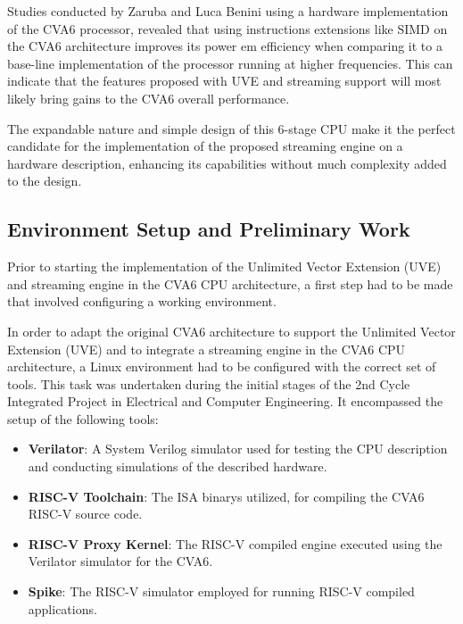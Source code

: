 Studies conducted by Zaruba and Luca Benini \cite{8777130} using a hardware implementation of the CVA6 processor, revealed that using instructions extensions like SIMD on the CVA6 architecture improves its power em efficiency when comparing it to a base-line implementation of the processor running at higher frequencies. This can indicate that the features proposed with UVE and streaming support will most likely bring gains to the CVA6 overall performance.


The expandable nature and simple design of this 6-stage CPU make it the perfect candidate for the implementation of the proposed streaming engine on a hardware description, enhancing its capabilities without much complexity added to the design.




\subsection{Environment Setup and Preliminary Work}

Prior to starting the implementation of the Unlimited Vector Extension (UVE) and streaming engine in the CVA6 CPU architecture, a first step had to be made that involved configuring a working environment.

In order to adapt the original CVA6 architecture to support the Unlimited Vector Extension (UVE) and to integrate a streaming engine in the CVA6 CPU architecture, a Linux environment had to be configured with the correct set of tools.  This task was undertaken during the initial stages of the 2nd Cycle Integrated Project in Electrical and Computer Engineering. It encompassed the setup of the following tools:
\begin{itemize}
    \item \textbf{Verilator}\cite{Verilator, Verilator-Doc}: A System Verilog simulator used for testing the CPU description and conducting simulations of the described hardware.
    \item \textbf{RISC-V Toolchain}\cite{RV-Doc}: The ISA  binarys utilized, for compiling the CVA6 RISC-V source code.
    \item \textbf{RISC-V Proxy Kernel}\cite{RV-PK}: The RISC-V compiled engine executed using the Verilator simulator for the CVA6.
    \item \textbf{Spike}\cite{Spike}: The RISC-V simulator employed for running RISC-V compiled applications.
\end{itemize}



